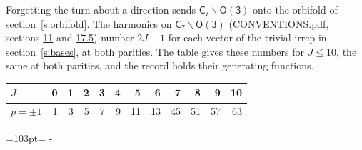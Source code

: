 \documentclass[10pt,a4paper]{article}
\newcommand{\needspace}[1]{\par\penalty-100\begingroup\dimen0=#1\relax\dimen2=\pagegoal
  \advance\dimen2-\pagetotal\ifdim\dimen0>\dimen2\relax\ifdim\dimen2>0pt\vfil\break\fi\fi
  \endgroup}
\numberwithin{equation}{section}
\newcommand{\grp}[1]{\mathsf{#1}}
\begin{document}
Forgetting the turn about a direction sends $\grp{C_{7}}\backslash\grp{O(3)}$ onto the orbifold of section~\ref{s:orbifold}.
The harmonics on $\grp{C_{7}}\backslash\grp{O(3)}$ (\href{../../CONVENTIONS.pdf}{CONVENTIONS.pdf}, sections \href{../../CONVENTIONS.pdf\#conv.11}{11} and \href{../../CONVENTIONS.pdf\#conv.17.5}{17.5}) number $2J + 1$ for each vector of the trivial irrep in section~\ref{s:bases}, at both parities. The table gives these numbers for $J \le 10$, the same at both parities, and the record holds their generating functions.
{\small\setlength{\tabcolsep}{4pt}\begin{longtable}{@{}lrrrrrrrrrrr@{}}\toprule
$J$ & 0 & 1 & 2 & 3 & 4 & 5 & 6 & 7 & 8 & 9 & 10\\\midrule\endhead
\bottomrule\endfoot\endlastfoot
$p = \pm 1$ & 1 & 3 & 5 & 7 & 9 & 11 & 13 & 45 & 51 & 57 & 63\\
\bottomrule\end{longtable}}
\needspace{103pt}
\end{document}

